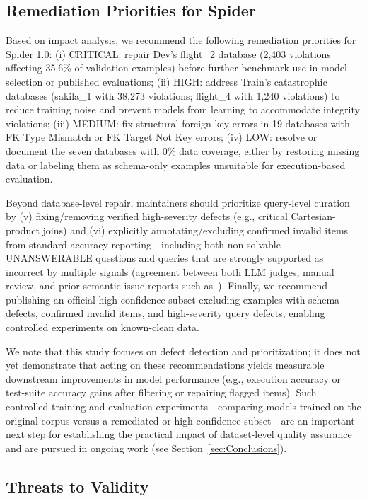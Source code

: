 \documentclass[print]{einformatica}
\begin{document}
\subsection{Remediation Priorities for Spider}

Based on impact analysis, we recommend the following remediation priorities for Spider 1.0: (i) CRITICAL: repair Dev's flight\_2 database (2,403 violations affecting 35.6\% of validation examples) before further benchmark use in model selection or published evaluations; (ii) HIGH: address Train's catastrophic databases (sakila\_1 with 38,273 violations; flight\_4 with 1,240 violations) to reduce training noise and prevent models from learning to accommodate integrity violations; (iii) MEDIUM: fix structural foreign key errors in 19 databases with FK Type Mismatch or FK Target Not Key errors; (iv) LOW: resolve or document the seven databases with 0\% data coverage, either by restoring missing data or labeling them as schema-only examples unsuitable for execution-based evaluation.

Beyond database-level repair, maintainers should prioritize query-level curation by (v) fixing/removing verified high-severity defects (e.g., critical Cartesian-product joins) and (vi) explicitly annotating/excluding confirmed invalid items from standard accuracy reporting---including both non-solvable UNANSWERABLE questions and queries that are strongly supported as incorrect by multiple signals (agreement between both LLM judges, manual review, and prior semantic issue reports such as~\cite{liu2025nl2sqlbugs}). Finally, we recommend publishing an official high-confidence subset excluding examples with schema defects, confirmed invalid items, and high-severity query defects, enabling controlled experiments on known-clean data.

We note that this study focuses on defect detection and prioritization; it does not yet demonstrate that acting on these recommendations yields measurable downstream improvements in model performance (e.g., execution accuracy or test-suite accuracy gains after filtering or repairing flagged items). Such controlled training and evaluation experiments---comparing models trained on the original corpus versus a remediated or high-confidence subset---are an important next step for establishing the practical impact of dataset-level quality assurance and are pursued in ongoing work (see Section~\ref{sec:Conclusions}).

\subsection{Threats to Validity}
\end{document}
